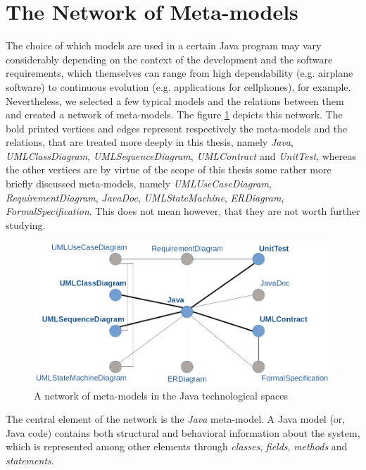 \documentclass[tuberlin,cic,tc,english,noabntcite]{iiufrgs}
\begin{document}
\section{The Network of Meta-models}
The choice of which models are used in a certain Java program may vary considerably depending on the context of the development and the software requirements, which themselves can range from high dependability (e.g. airplane software) to continuous evolution (e.g. applications for cellphones), for example. Nevertheless, we selected a few typical models and the relations between them and created a network of meta-models. The figure \ref{fig:network_metamodels} depicts this network. The bold printed vertices and edges represent respectively the meta-models and the relations, that are treated more deeply in this thesis, namely \emph{Java}, \emph{UMLClassDiagram}, \emph{UMLSequenceDiagram}, \emph{UMLContract} and \emph{UnitTest}, whereas the other vertices are by virtue of the scope of this thesis some rather more briefly discussed meta-models, namely \emph{UMLUseCaseDiagram}, \emph{RequirementDiagram}, \emph{JavaDoc}, \emph{UMLStateMachine}, \emph{ERDiagram}, \emph{FormalSpecification}. This does not mean however, that they are not worth further studying.

\begin{figure}[h]
    \caption{A network of meta-models in the Java technological spaces}
    \begin{center}
        \includegraphics[width=30em]{network_metamodels}
    \end{center}
    \label{fig:network_metamodels}
\end{figure}

The central element of the network is the \emph{Java} meta-model. A Java model (or, Java code) contains both structural and behavioral information about the system, which is represented among other elements through \emph{classes}, \emph{fields}, \emph{methods} and \emph{statements}.
\end{document}

